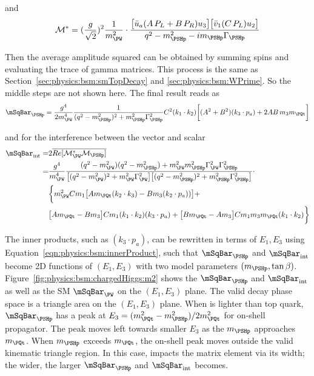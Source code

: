 \noindent and
\begin{equation}
	\mathcal{M}^*  =  (\frac{g   }{\sqrt{2}})^2 \frac{1}{m^2_{\PW}}  \cdot 
    \frac{ \big[ \bar{u}_a  (A \, P_L + B  \, P_R) u_3 \big] \big[ \bar{v}_1 ( C  \, P_L) u_2 \big]  }{q^2-m^2_{\PSHp} - i m_{\PSHp} \Gamma_{\PSHp}} 
\end{equation}

\noindent Then the average amplitude squared can be obtained by summing spins and evaluating the trace of gamma matrices. This process is the same as Section~\ref{sec:physics:bsm:smTopDecay} and \ref{sec:physics:bsm:WPrime}. So the middle steps are not shown here. The final result reads as
\begin{equation}
	\mSqBar_{\PSHp} = \frac{g^4}{2 m^4_{\PW}} \frac{1}{ (q^2-m^2_{\PSHp})^2 +  m^2_{\PSHp} \Gamma^2_{\PSHp}} 
    C^2 (k_1 \cdot k_2) \bigg[ (A^2 + B^2) (k_3 \cdot p_a ) + 2 AB \, m_3  m_\PQt\bigg]
\end{equation}


\noindent and for the interference between the vector \PW and scalar \PSHp 
\begin{equation}
\begin{split}
    \mSqBar _{\mathrm{int}} = &   2 \overline{ Re[\mathcal{M}^*_{\PW} \mathcal{M}_{\PSHp}] }  \\
    =& \frac{g ^4}{m_\PW^4} \frac
    {( q^2-m^2_{\PW}) ( q^2-m^2_{\PSHp}) + m^2_{\PW}  m^2_{\PSHp}  \Gamma^2_{\PW} \Gamma^2_{\PSHp} }
    { \big[ ( q^2-m^2_{\PW})^2 +  m^2_{\PW} \Gamma^2_{\PW} \big] \big[ (  q^2-m^2_{\PSHp})^2 +  m^2_{\PSHp} \Gamma^2_{\PSHp} \big] }  \cdot \\
    & \bigg\{
    m_\PW^2  C m_1 \big[A  m_\PQt (k_2 \cdot k_3) - B m_3 (k_2 \cdot p_a) ) \big] + \\
    & \big[A m_\PQt - B m_3 \big] C m_1  (k_1 \cdot k_2) (k_3 \cdot p_a)   +  \big[B m_\PQt - A m_3\big]  C m_1 m_3  m_\PQt (k_1 \cdot k_2)  
    \bigg\}
\end{split}
\end{equation}

\noindent The inner products, such as $(k_3 \cdot p_a) $, can be rewritten in terms of $E_1, E_3$ using Equation~\ref{eqn:physics:bsm:innerProduct}, such that $\mSqBar _{\PSHp}$ and $ \mSqBar _{\mathrm{int}}$ become 2D functions of $(E_1, E_3)$  with two model parameters $(m_{\PSHp}, \tan\beta)$. Figure~\ref{fig:physics:bsm:chargedHiggs:m2} shows the $\mSqBar _{\PSHp}$ and $ \mSqBar _{\mathrm{int}}$ as well as the SM $\mSqBar _{\PW}$ on the $(E_1, E_3)$  plane. The valid decay phase space is a triangle area on the  $(E_1, E_3)$ plane. When \PSHp is lighter than top quark, $\mSqBar _{\PSHp}$ has a peak at $E_3=(m_\PQt^2-m_{\PSHp}^2)/2m_\PQt^2$ for on-shell \PSHp propagator. The peak moves left towards smaller $E_3$ as the $m_{\PSHp}$ approaches $m_\PQt$. When $m_{\PSHp}$ exceeds $m_\PQt$, the on-shell \PSHp peak moves outside the valid kinematic triangle region. In this case, \PSHp impacts the matrix element via its width; the wider, the larger $\mSqBar _{\PSHp}$ and $ \mSqBar _{\mathrm{int}}$ becomes.

